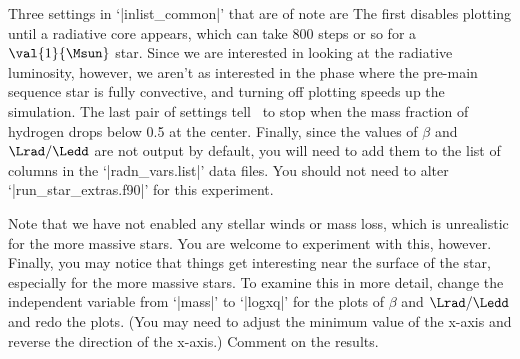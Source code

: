 \begin{mesaproject}
Three settings in `|inlist_common|' that are of note are
The first disables plotting until a radiative core appears, which can take 800 steps or so for a $\val{1}{\Msun}$ star. Since we are interested in looking at the radiative luminosity, however, we aren't as interested in the phase where the pre-main sequence star is fully convective, and turning off plotting speeds up the simulation. The last pair of settings tell \mesa\ to stop when the mass fraction of hydrogen drops below 0.5 at the center. Finally, since the values of $\beta$ and $\Lrad/\Ledd$ are not output by default, you will need to add them to the list of columns in the `|radn_vars.list|' data files. You should not need to alter `|run_star_extras.f90|' for this experiment.

Note that we have not enabled any stellar winds or mass loss, which is unrealistic for the more massive stars. You are welcome to experiment with this, however.
Finally, you may notice that things get interesting near the surface of the star, especially for the more massive stars. To examine this in more detail, change the independent variable from `|mass|' to `|logxq|' for the plots of $\beta$ and $\Lrad/\Ledd$ and redo the plots. (You may need to adjust the minimum value of the x-axis and reverse the direction of the x-axis.) Comment on the results.
\end{mesaproject}
\UndefineShortVerb{\|}
